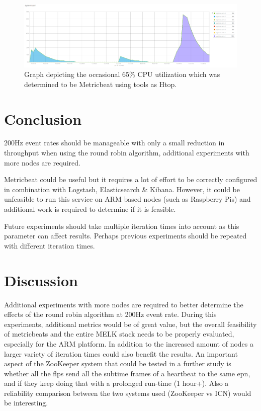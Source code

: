 \documentclass[]{article}
\begin{document}
\begin{center}
	\begin{figure}[H]
		\includegraphics[width=\textwidth]{images/metric-load}
		\caption{Graph depicting the occasional 65\% CPU utilization which was determined to be Metricbeat using tools as Htop.}
		\label{fig:ssh}
	\end{figure}
\end{center}

\section{Conclusion}
200Hz event rates should be manageable with only a small reduction in throughput when using the round robin algorithm, additional experiments with more nodes are required.

Metricbeat could be useful but it requires a lot of effort to be correctly configured in combination with Logstash, Elasticsearch \& Kibana. However, it could be unfeasible to run this service on ARM based nodes (such as Raspberry Pis) and additional work is required to determine if it is feasible.

Future experiments should take multiple iteration times into account as this parameter can affect results. Perhaps previous experiments should be repeated with different iteration times.

\section{Discussion}
Additional experiments with more nodes are required to better determine the effects of the round robin algorithm at 200Hz event rate. During this experiments, additional metrics would be of great value, but the overall feasibility of metricbeats and the entire MELK stack needs to be properly evaluated, especially for the ARM platform. In addition to the increased amount of nodes a larger variety of iteration times could also benefit the results.
An important aspect of the ZooKeeper system that could be tested in a further study is whether all the flps send all the subtime frames of a heartbeat to the same epn, and if they keep doing that with a prolonged run-time (1 hour+). Also a reliability comparison between the two systems used (ZooKeeper vs ICN) would be interesting.
\end{document}
